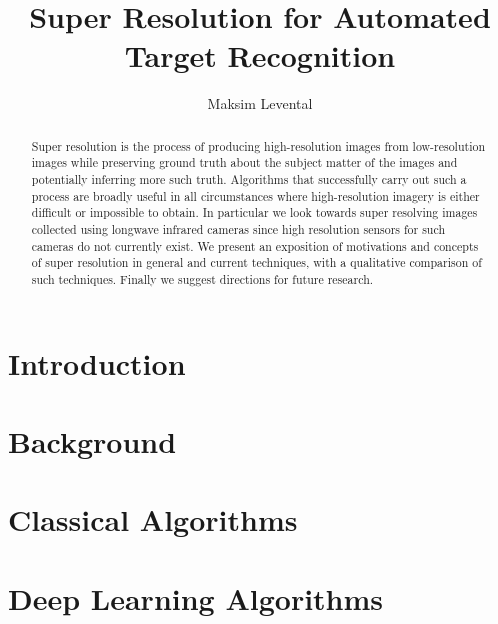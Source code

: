 \documentclass[journal]{IEEEtran}
\begin{document}
    \title{Super Resolution for Automated Target Recognition}
    \author{Maksim Levental}
    \maketitle
    \etocruledstyle[1]{}


    \begin{abstract}
        Super resolution is the process of producing high-resolution images from low-resolution images while preserving ground truth about the subject matter of the images and potentially inferring more such truth.
        Algorithms that successfully carry out such a process are broadly useful in all circumstances where high-resolution imagery is either difficult or impossible to obtain.
        In particular we look towards super resolving images collected using longwave infrared cameras since high resolution sensors for such cameras do not currently exist.
        We present an exposition of motivations and concepts of super resolution in general and current techniques, with a qualitative comparison of such techniques.
        Finally we suggest directions for future research.
    \end{abstract}

    \section{Introduction}\label{sec:introduction}
    \localtableofcontents
    

    \section{Background}\label{sec:background}
    \localtableofcontents
    

    \section{Classical Algorithms}\label{sec:classical-algorithms}
    \localtableofcontents
    

    \section{Deep Learning Algorithms}\label{sec:deep-learning-algorithms}
\end{document}
